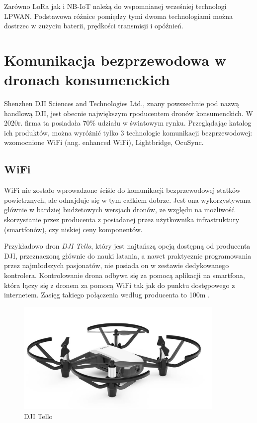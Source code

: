 \documentclass[12pt, a4paper, twoside]{report}
\begin{document}
\hspace{1cm}Zarówno LoRa jak i NB-IoT należą do wspomnianej wcześniej technologi LPWAN. Podstawowa różnice pomiędzy tymi dwoma technologiami można dostrzec w zużyciu baterii, prędkości transmisji i opóźnień.

\section{Komunikacja bezprzewodowa w dronach konsumenckich}
\hspace{1cm}Shenzhen DJI Sciences and Technologies Ltd., znany powszechnie pod nazwą handlową DJI, jest obecnie największym rpoducentem dronów konsumenckich. W 2020r. firma ta posiadała 70\% udziału w światowym rynku. \cite{dji-wiki} Przeglądając katalog ich produktów, można wyróżnić tylko 3 technologie komunikacji bezprzewodowej: wzomocnione WiFi (ang. enhanced WiFi), Lightbridge, OcuSync.

\subsection{WiFi}
\hspace{1cm}WiFi nie zostało wprowadzone ściśle do komunikacji bezprzewodowej statków powietrznych, ale odnajduje się w tym całkiem dobrze. Jest ona wykorzystywana głównie w bardziej budżetowych wersjach dronów, ze względu na możliwość skorzystanie przez producenta z posiadanej przez użytkownika infrastruktury (smartfonów), czy niskiej ceny komponentów.

\hspace{1cm}Przykładowo dron \emph{DJI Tello}, który jest najtańszą opcją dostępną od producenta DJI, przeznaczoną głównie do nauki latania, a nawet praktycznie programowania przez najmłodszych pasjonatów, nie posiada on w zestawie dedykowanego kontrolera. Kontrolowanie drona odbywa się za pomocą aplikacji na smartfona, która łączy się z dronem za pomocą WiFi tak jak do punktu dostępowego z internetem. Zasięg takiego połączenia według producenta to 100m \cite{dji-store}.


\begin{figure}[!htbp]
  \centering
  \includegraphics[width=10cm]{Obrazy/dji-tello.jpg}
  \caption{DJI Tello\cite{dji-store}}
  \end{figure}
\end{document}
